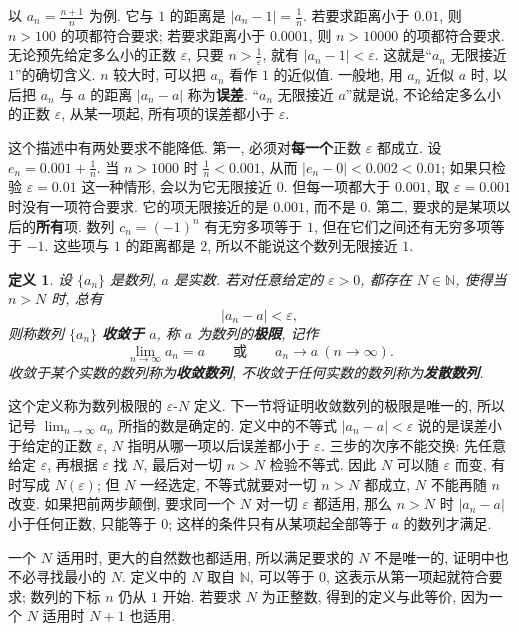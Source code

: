 \documentclass[UTF8,openany]{ctexbook}
\theoremstyle{chinesetextbook}
\newtheorem{definition}{定义}[section]
\begin{document}
以 $\displaystyle a_n=\frac{n+1}n$ 为例. 它与 $1$ 的距离是 $\displaystyle|a_n-1|=\frac1n$. 若要求距离小于 $0.01$, 则 $n>100$ 的项都符合要求; 若要求距离小于 $0.0001$, 则 $n>10000$ 的项都符合要求. 无论预先给定多么小的正数 $\varepsilon$, 只要 $\displaystyle n>\frac1\varepsilon$, 就有 $|a_n-1|<\varepsilon$. 这就是“$a_n$ 无限接近 $1$”的确切含义. $n$ 较大时, 可以把 $a_n$ 看作 $1$ 的近似值. 一般地, 用 $a_n$ 近似 $a$ 时, 以后把 $a_n$ 与 $a$ 的距离 $|a_n-a|$ 称为\textbf{误差}. “$a_n$ 无限接近 $a$”就是说, 不论给定多么小的正数 $\varepsilon$, 从某一项起, 所有项的误差都小于 $\varepsilon$.

这个描述中有两处要求不能降低. 第一, 必须对\textbf{每一个}正数 $\varepsilon$ 都成立. 设 $\displaystyle e_n=0.001+\frac1n$. 当 $n>1000$ 时 $\displaystyle\frac1n<0.001$, 从而 $|e_n-0|<0.002<0.01$; 如果只检验 $\varepsilon=0.01$ 这一种情形, 会以为它无限接近 $0$. 但每一项都大于 $0.001$, 取 $\varepsilon=0.001$ 时没有一项符合要求. 它的项无限接近的是 $0.001$, 而不是 $0$. 第二, 要求的是某项以后的\textbf{所有}项. 数列 $c_n=(-1)^n$ 有无穷多项等于 $1$, 但在它们之间还有无穷多项等于 $-1$. 这些项与 $1$ 的距离都是 $2$, 所以不能说这个数列无限接近 $1$.
\begin{definition}
设 $\{a_n\}$ 是数列, $a$ 是实数. 若对任意给定的 $\varepsilon>0$, 都存在 $N\in\mathbb N$, 使得当 $n>N$ 时, 总有
\[
|a_n-a|<\varepsilon,
\]
则称数列 $\{a_n\}$ \textbf{收敛于} $a$, 称 $a$ 为数列的\textbf{极限}, 记作
\[
\lim_{n\to\infty}a_n=a\qquad\text{或}\qquad a_n\to a\ (n\to\infty).
\]
收敛于某个实数的数列称为\textbf{收敛数列}, 不收敛于任何实数的数列称为\textbf{发散数列}.
\end{definition}
这个定义称为数列极限的 $\varepsilon$-$N$ 定义. 下一节将证明收敛数列的极限是唯一的, 所以记号 $\displaystyle\lim_{n\to\infty}a_n$ 所指的数是确定的. 定义中的不等式 $|a_n-a|<\varepsilon$ 说的是误差小于给定的正数 $\varepsilon$, $N$ 指明从哪一项以后误差都小于 $\varepsilon$. 三步的次序不能交换: 先任意给定 $\varepsilon$, 再根据 $\varepsilon$ 找 $N$, 最后对一切 $n>N$ 检验不等式. 因此 $N$ 可以随 $\varepsilon$ 而变, 有时写成 $N(\varepsilon)$; 但 $N$ 一经选定, 不等式就要对一切 $n>N$ 都成立, $N$ 不能再随 $n$ 改变. 如果把前两步颠倒, 要求同一个 $N$ 对一切 $\varepsilon$ 都适用, 那么 $n>N$ 时 $|a_n-a|$ 小于任何正数, 只能等于 $0$; 这样的条件只有从某项起全部等于 $a$ 的数列才满足.

一个 $N$ 适用时, 更大的自然数也都适用, 所以满足要求的 $N$ 不是唯一的, 证明中也不必寻找最小的 $N$. 定义中的 $N$ 取自 $\mathbb N$, 可以等于 $0$, 这表示从第一项起就符合要求; 数列的下标 $n$ 仍从 $1$ 开始. 若要求 $N$ 为正整数, 得到的定义与此等价, 因为一个 $N$ 适用时 $N+1$ 也适用.
\end{document}
